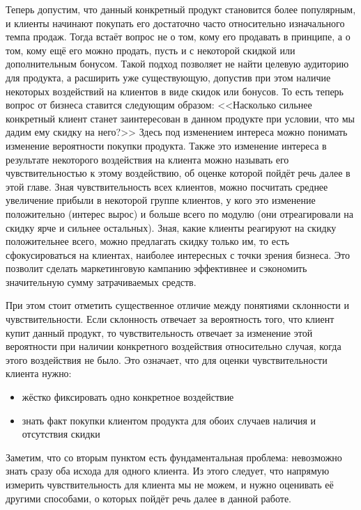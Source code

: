 Теперь допустим, что данный конкретный продукт становится более популярным, и клиенты начинают покупать его достаточно часто относительно изначального темпа продаж. Тогда встаёт вопрос не о том, кому его продавать в принципе, а о том, кому ещё его можно продать, пусть и с некоторой скидкой или дополнительным бонусом. Такой подход позволяет не найти целевую аудиторию для продукта, а расширить уже существующую, допустив при этом наличие некоторых воздействий на клиентов в виде скидок или бонусов. То есть теперь вопрос от бизнеса ставится следующим образом: <<Насколько сильнее конкретный клиент станет заинтересован в данном продукте при условии, что мы дадим ему скидку на него?>> Здесь под изменением интереса можно понимать изменение вероятности покупки продукта. Также это изменение интереса в результате некоторого воздействия на клиента можно называть его чувствительностью к этому воздействию, об оценке которой пойдёт речь далее в этой главе. Зная чувствительность всех клиентов, можно посчитать среднее увеличение прибыли в некоторой группе клиентов, у кого это изменение положительно (интерес вырос) и больше всего по модулю (они отреагировали на скидку ярче и сильнее остальных). Зная, какие клиенты реагируют на скидку положительнее всего, можно предлагать скидку только им, то есть сфокусироваться на клиентах, наиболее интересных с точки зрения бизнеса. Это позволит сделать маркетинговую кампанию эффективнее и сэкономить значительную сумму затрачиваемых средств.

При этом стоит отметить существенное отличие между понятиями склонности и чувствительности. Если склонность отвечает за вероятность того, что клиент купит данный продукт, то чувствительность отвечает за изменение этой вероятности при наличии конкретного воздействия относительно случая, когда этого воздействия не было. Это означает, что для оценки чувствительности клиента нужно:
\begin{itemize}
    \item жёстко фиксировать одно конкретное воздействие
    \item знать факт покупки клиентом продукта для обоих случаев наличия и отсутствия скидки
\end{itemize}

Заметим, что со вторым пунктом есть фундаментальная проблема: невозможно знать сразу оба исхода для одного клиента. Из этого следует, что напрямую измерить чувствительность для клиента мы не можем, и нужно оценивать её другими способами, о которых пойдёт речь далее в данной работе.

